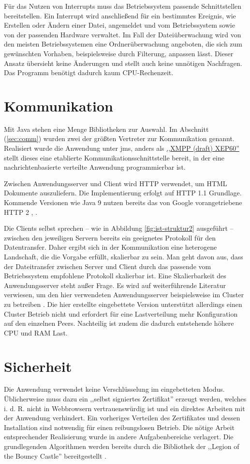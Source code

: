 \documentclass[oneside, ngerman, toc=bibliography,bibliography=totoc,listof=entryprefix, open=right,numbers=noenddot,fontsize=12pt]{scrbook}
\begin{document}
Für das Nutzen von {Interrupts} muss das Betriebssystem passende Schnittstellen bereitstellen. Ein {Interrupt} wird anschließend für ein bestimmtes Ereignis, wie Erstellen oder Ändern einer Datei, angemeldet und vom Betriebssystem sowie von der passenden Hardware verwaltet. Im Fall der Dateiüberwachung wird von den meisten Betriebssystemen eine Ordnerüberwachung angeboten, die sich zum gewünschten Vorhaben, beispielsweise durch Filterung, anpassen lässt. Dieser Ansatz übersieht keine Änderungen und stellt auch keine unnötigen Nachfragen. Das Programm benötigt dadurch kaum CPU-Rechenzeit.


\section{Kommunikation}
Mit Java stehen eine Menge Bibliotheken zur Auswahl. Im Abschnitt (\ref{sec:comm}) wurden zwei der größten Vertreter zur Kommunikation genannt. Realisiert wurde die Anwendung unter \acrshort{jms}, anders als  \href{http://xmpp.org/extensions/xep-0060.html}{,,XMPP (draft) XEP60''} stellt dieses eine etablierte Kommunikationsschnittstelle bereit, in der eine nachrichtenbasierte verteilte Anwendung programmierbar ist.

Zwischen Anwendungsserver und Client wird HTTP verwendet, um HTML Dokumente auszuliefern. Die Implementierung erfolgt auf HTTP 1.1 Grundlage. Kommende Versionen wie Java 9 nutzen bereits das von Google vorangetriebene HTTP 2 \cite{httpx1}, \cite{httpx2}.

Die Clients selbst sprechen -- wie in  Abbildung \ref{fig:ist-struktur2} ausgeführt -- zwischen den jeweiligen Servern bereits ein geeignetes Protokoll für den Datentransfer. Daher ergibt sich in der Kommunikation eine heterogene Landschaft, die die Vorgabe erfüllt, skalierbar zu sein. Man geht davon aus, dass der Dateitransfer zwischen Server und Client durch das passende vom Betriebssystem empfohlene Protokoll skalierbar ist. Eine Skalierbarkeit des Anwendungsserver  steht außer Frage. Es wird auf weiterführende Literatur verwiesen, um den hier verwendeten Anwendungsserver beispielsweise im Cluster zu betreiben \cite{glassfishcluster}.
Die hier erstellte eingebettete Version unterstützt allerdings einen Cluster Betrieb nicht und erfordert für eine Lastverteilung mehr Konfiguration auf den einzelnen Peers. Nachteilig ist zudem die dadurch entstehende höhere CPU und RAM Last.
 
\section{Sicherheit}
Die Anwendung verwendet keine Verschlüsselung im eingebetteten Modus. Üblicherweise muss dazu ein ,,selbst signiertes Zertifikat'' erzeugt werden, welches i. d. R. nicht in Webbrowsern vertrauenswürdig ist und ein direktes Arbeiten mit der Anwendung verhindert. Ein vorheriges Verteilen des Zertifikates und dessen Installation sind notwendig für einen reibungslosen Betrieb. Die nötige Arbeit entsprechender Realisierung wurde in andere Aufgabenbereiche verlagert. Die grundlegenden Algorithmen werden bereits durch die Bibliothek der ,,Legion of the Bouncy Castle'' bereitgestellt \cite{javabc}.
\end{document}
